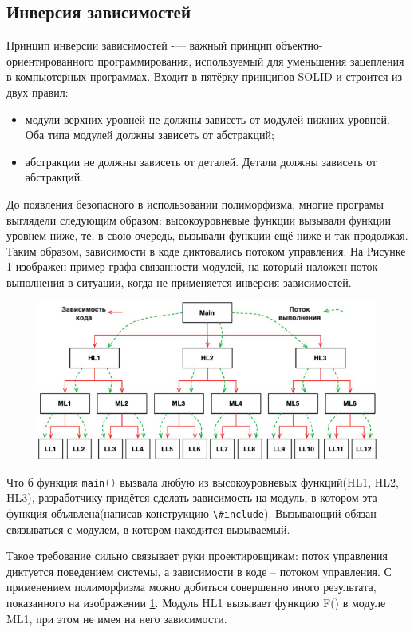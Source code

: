\subsection{Инверсия зависимостей}

Принцип инверсии зависимостей -— важный принцип объектно-ориентированного программирования, используемый для уменьшения зацепления в компьютерных программах. Входит в пятёрку принципов SOLID и строится из двух правил:
\begin{itemize}
	\item модули верхних уровней не должны зависеть от модулей нижних уровней. Оба типа модулей должны зависеть от абстракций;
	\item абстракции не должны зависеть от деталей. Детали должны зависеть от абстракций.
\end{itemize}

До появления безопасного в использовании полиморфизма, многие програмы выглядели следующим образом: высокоуровневые функции вызывали функции уровнем ниже, те, в свою очередь, вызывали функции ещё ниже и так продолжая. Таким образом, зависимости в коде диктовались потоком управления. На Рисунке \ref{img:direct:dep} изображен пример графа связанности модулей, на который наложен поток выполнения в ситуации, когда не применяется инверсия зависимостей.

\begin{figure}[h]
  \centering
    \includegraphics{inc/img/direct}
  \label{img:direct:dep}
\end{figure}

Что б функция \lstinline[language=C]{main()} вызвала любую из высокоуровневых функций(HL1, HL2, HL3), разработчику придётся сделать зависимость на модуль, в котором эта функция объявлена(написав конструкцию \lstinline[language=C]{\#include}). Вызывающий обязан связываться с модулем, в котором находится вызываемый.

Такое требование сильно связывает руки проектировщикам: поток управления диктуется поведением системы, а зависимости в коде -- потоком управления. С применением полиморфизма можно добиться совершенно иного результата, показанного на изображении \ref{img:direct:dep}. Модуль HL1 вызывает функцию F() в модуле ML1, при этом не имея на него зависимости.

